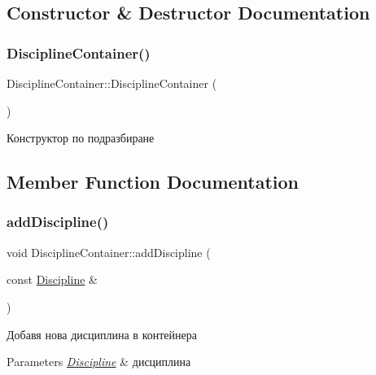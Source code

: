 \subsection{Constructor \& Destructor Documentation}
\mbox{\label{class_discipline_container_a43b580c11fca8f1309abdf8384908625}} 
\subsubsection{\texorpdfstring{Discipline\+Container()}{DisciplineContainer()}}
{\footnotesize\ttfamily Discipline\+Container\+::\+Discipline\+Container (\begin{DoxyParamCaption}{ }\end{DoxyParamCaption})\hspace{0.3cm}{\ttfamily [default]}}



Конструктор по подразбиране 



\subsection{Member Function Documentation}
\mbox{\label{class_discipline_container_af7be4f1504b7f6dbc65ddf4af9799fcd}} 
\subsubsection{\texorpdfstring{add\+Discipline()}{addDiscipline()}}
{\footnotesize\ttfamily void Discipline\+Container\+::add\+Discipline (\begin{DoxyParamCaption}\item[{const \hyperlink{class_discipline}{Discipline} \&}]{ }\end{DoxyParamCaption})}



Добавя нова дисциплина в контейнера 


\begin{DoxyParams}{Parameters}
{\em \hyperlink{class_discipline}{Discipline}} & дисциплина \\
\hline
\end{DoxyParams}
\mbox{\label{class_discipline_container_a22a8e254017993dc4d51511f3ee0e14f}} 
